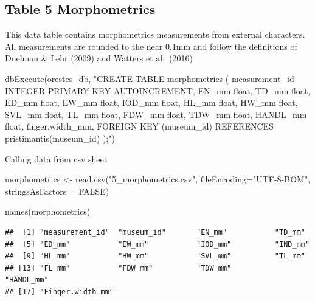 \documentclass[
]{book}
\newenvironment{Shaded}{\begin{snugshade}}{\end{snugshade}}
\newcommand{\AttributeTok}[1]{\textcolor[rgb]{0.77,0.63,0.00}{#1}}
\newcommand{\ConstantTok}[1]{\textcolor[rgb]{0.00,0.00,0.00}{#1}}
\newcommand{\FunctionTok}[1]{\textcolor[rgb]{0.00,0.00,0.00}{#1}}
\newcommand{\NormalTok}[1]{#1}
\newcommand{\OtherTok}[1]{\textcolor[rgb]{0.56,0.35,0.01}{#1}}
\newcommand{\StringTok}[1]{\textcolor[rgb]{0.31,0.60,0.02}{#1}}
\begin{document}
\hypertarget{table-5-morphometrics}{%
\subsection{Table 5 Morphometrics}\label{table-5-morphometrics}}

This data table contains morphometrics measurements from external characters. All measurements are rounded to the near 0.1mm and follow the definitions of Duelman \& Lehr (2009) and Watters et al.~(2016)

\begin{Shaded}
\begin{Highlighting}[]
\FunctionTok{dbExecute}\NormalTok{(orestes\_db, }\StringTok{"CREATE TABLE morphometrics (}
\StringTok{measurement\_id INTEGER PRIMARY KEY AUTOINCREMENT,}
\StringTok{EN\_mm float,}
\StringTok{TD\_mm float,}
\StringTok{ED\_mm float,}
\StringTok{EW\_mm float,}
\StringTok{IOD\_mm float,}
\StringTok{HL\_mm float,}
\StringTok{HW\_mm float,}
\StringTok{SVL\_mm float, }
\StringTok{TL\_mm float, }
\StringTok{FDW\_mm float,}
\StringTok{TDW\_mm float,}
\StringTok{HANDL\_mm float,}
\StringTok{finger.width\_mm,}
\StringTok{FOREIGN KEY (museum\_id) REFERENCES pristimantis(museum\_id)}
\StringTok{);"}\NormalTok{)}
\end{Highlighting}
\end{Shaded}

Calling data from csv sheet

\begin{Shaded}
\begin{Highlighting}[]
\NormalTok{morphometrics }\OtherTok{\textless{}{-}} \FunctionTok{read.csv}\NormalTok{(}\StringTok{"5\_morphometrics.csv"}\NormalTok{, }\AttributeTok{fileEncoding=}\StringTok{"UTF{-}8{-}BOM"}\NormalTok{, }
                   \AttributeTok{stringsAsFactors =} \ConstantTok{FALSE}\NormalTok{) }

\FunctionTok{names}\NormalTok{(morphometrics)}
\end{Highlighting}
\end{Shaded}

\begin{verbatim}
##  [1] "measurement_id"  "museum_id"       "EN_mm"           "TD_mm"          
##  [5] "ED_mm"           "EW_mm"           "IOD_mm"          "IND_mm"         
##  [9] "HL_mm"           "HW_mm"           "SVL_mm"          "TL_mm"          
## [13] "FL_mm"           "FDW_mm"          "TDW_mm"          "HANDL_mm"       
## [17] "Finger.width_mm"
\end{verbatim}
\end{document}

